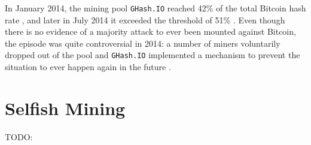 \pagebreak

In January 2014, the mining pool \texttt{GHash.IO} reached \num{42}\% of the total Bitcoin hash rate \cite{ghash_fears_51_attack, security_survey_2017}, and later in July 2014 it exceeded the threshold of \num{51}\% \cite{wikipedia_ghash, majority_investopedia, bitcoin_wiki_irreversible_transactions}.
Even though there is no evidence of a majority attack to ever been mounted against Bitcoin, the episode was quite controversial in 2014:
a number of miners voluntarily dropped out of the pool and \texttt{GHash.IO} implemented a mechanism to prevent the situation to ever happen again in the future \cite{ghash_51_percent_extremetech, ghash_commits_to_40_percent_coindesk, ghash_commits_to_40_percent_arstechnica}.


\section{Selfish Mining}
TODO: \cite{selfish_mining, selfish_mining_acm}
